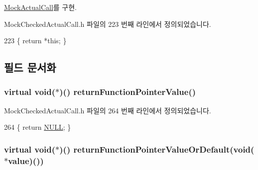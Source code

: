 \hyperlink{class_mock_actual_call_ab11fb46b42771e1421ce02b8e1851b9f}{Mock\+Actual\+Call}를 구현.



Mock\+Checked\+Actual\+Call.\+h 파일의 223 번째 라인에서 정의되었습니다.


\begin{DoxyCode}
223 \{ \textcolor{keywordflow}{return} *\textcolor{keyword}{this}; \}
\end{DoxyCode}


\subsection{필드 문서화}
\subsubsection[{\texorpdfstring{return\+Function\+Pointer\+Value}{returnFunctionPointerValue}}]{\setlength{\rightskip}{0pt plus 5cm}virtual void($\ast$)() return\+Function\+Pointer\+Value()\hspace{0.3cm}{\ttfamily [inline]}}\hypertarget{class_mock_ignored_actual_call_abd8adc7ad48025440b2a4aee485f560d}{}\label{class_mock_ignored_actual_call_abd8adc7ad48025440b2a4aee485f560d}


Mock\+Checked\+Actual\+Call.\+h 파일의 264 번째 라인에서 정의되었습니다.


\begin{DoxyCode}
264 \{ \textcolor{keywordflow}{return} \hyperlink{openavb__types__base__pub_8h_a070d2ce7b6bb7e5c05602aa8c308d0c4}{NULL}; \}
\end{DoxyCode}
\subsubsection[{\texorpdfstring{return\+Function\+Pointer\+Value\+Or\+Default}{returnFunctionPointerValueOrDefault}}]{\setlength{\rightskip}{0pt plus 5cm}virtual void($\ast$)() return\+Function\+Pointer\+Value\+Or\+Default(void($\ast$value)())\hspace{0.3cm}{\ttfamily [inline]}}\hypertarget{class_mock_ignored_actual_call_a49cb9d9fc33c535ac64a4ee6d95f7b80}{}\label{class_mock_ignored_actual_call_a49cb9d9fc33c535ac64a4ee6d95f7b80}


